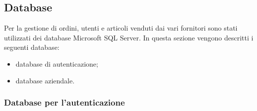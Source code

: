 \documentclass[12pt, a4paper, titlepage]{report}
\begin{document}
	\subsection{Database}
	
	Per la gestione di ordini, utenti e articoli venduti dai vari fornitori sono stati utilizzati dei database Microsoft SQL Server. In questa sezione vengono descritti i seguenti database:
	\begin{itemize}
		\item database di autenticazione;
		\item database aziendale.
	\end{itemize}
	
	\subsubsection{Database per l'autenticazione}
	
\end{document}
